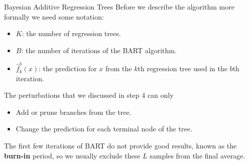 \documentclass[
  ignorenonframetext,
  aspectratio=169,
]{beamer}
\begin{document}
\begin{frame}{Bayesian Additive Regression Trees}
\protect\hypertarget{bayesian-additive-regression-trees-1}{}
Before we describe the algorithm more formally we need some notation:

\begin{itemize}
\item
  \(K\): the number of regression trees.
\item
  \(B\): the number of iterations of the BART algorithm.
\item
  \(\hat{f}_{k}^{b}(x)\): the prediction for \(x\) from the \(k\)th
  regression tree used in the \(b\)th iteration.
\end{itemize}

The perturbations that we discussed in step 4 can only

\begin{itemize}
\item
  Add or prune branches from the tree.
\item
  Change the prediction for each terminal node of the tree.
\end{itemize}

The first few iterations of BART do not provide good results, known as
the \textbf{burn-in} period, so we usually exclude these \(L\) samples
from the final average.
\end{frame}
\end{document}
